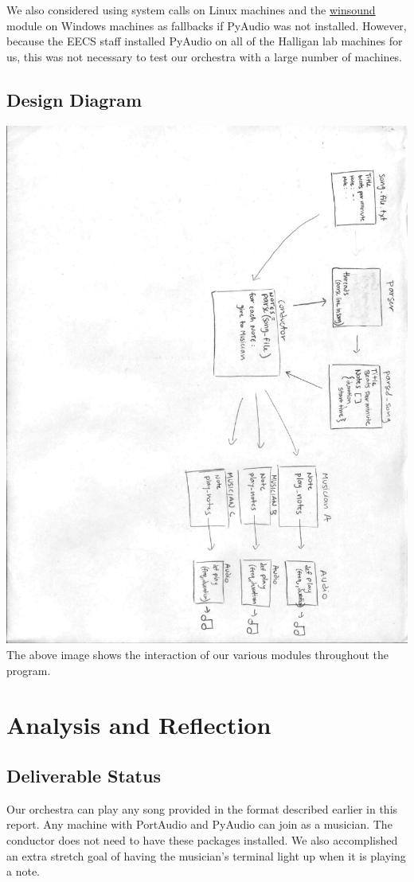 \documentclass[12pt, letterpaper]{article}
\begin{document}
We also considered using system calls on Linux machines and the
\href{https://docs.python.org/2/library/winsound.html}{winsound} module on Windows machines as
fallbacks if PyAudio was not installed. However, because the EECS staff installed PyAudio on all of
the Halligan lab machines for us, this was not necessary to test our orchestra with a large number
of machines.


\subsection{Design Diagram}
\includegraphics[height=\textwidth, angle=90]{design_diagram.pdf}
The above image shows the interaction of our various modules throughout the program.


\section{Analysis and Reflection}

\subsection{Deliverable Status}
Our orchestra can play any song provided in the format described earlier in this report. Any machine
with PortAudio and PyAudio can join as a musician. The conductor does not need to have these
packages installed. We also accomplished an extra stretch goal of having the musician's terminal
light up when it is playing a note.
\end{document}
